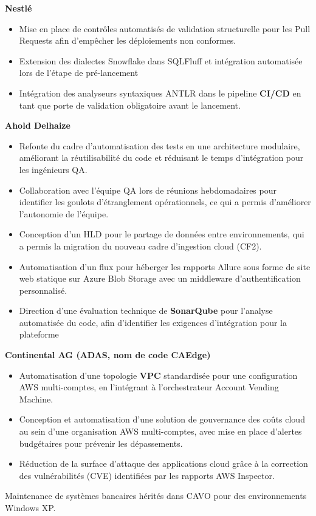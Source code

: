 \vspace{1em}
\noindent \textbf{Nestlé}
\begin{itemize}[label=\tiny$\bullet$, leftmargin=1em, nosep]
	\item Mise en place de contrôles automatisés de validation structurelle pour les Pull Requests afin d'empêcher les déploiements non conformes.
	\item Extension des dialectes Snowflake dans SQLFluff et intégration automatisée lors de l'étape de pré-lancement
	\item Intégration des analyseurs syntaxiques ANTLR dans le pipeline \textbf{CI/CD} en tant que porte de validation obligatoire avant le lancement.
\end{itemize}

\vspace{1em}
\noindent \textbf{Ahold Delhaize}
\begin{itemize}[label=\tiny$\bullet$, leftmargin=1em]
	\item Refonte du cadre d'automatisation des tests en une architecture modulaire, améliorant la réutilisabilité du code et réduisant le temps d'intégration pour les ingénieurs QA.
	\item Collaboration avec l'équipe QA lors de réunions hebdomadaires pour identifier les goulots d'étranglement opérationnels, ce qui a permis d'améliorer l'autonomie de l'équipe.
	\item Conception d'un HLD pour le partage de données entre environnements, qui a permis la migration du nouveau cadre d'ingestion cloud (CF2).
	\item Automatisation d'un flux pour héberger les rapports Allure sous forme de site web statique sur Azure Blob Storage avec un middleware d'authentification personnalisé.
	\item Direction d'une évaluation technique de \textbf{SonarQube} pour l'analyse automatisée du code, afin d'identifier les exigences d'intégration pour la plateforme
\end{itemize}

\vspace{1em}
\noindent \textbf{Continental AG (ADAS, nom de code CAEdge)}
\begin{itemize}[label=\tiny$\bullet$, leftmargin=1em]
	\item Automatisation d'une topologie \textbf{VPC} standardisée pour une configuration AWS multi-comptes, en l'intégrant à l'orchestrateur Account Vending Machine.
	\item Conception et automatisation d'une solution de gouvernance des coûts cloud au sein d'une organisation AWS multi-comptes, avec mise en place d'alertes budgétaires pour prévenir les dépassements.
	\item Réduction de la surface d'attaque des applications cloud grâce à la correction des vulnérabilités (CVE) identifiées par les rapports AWS Inspector.
\end{itemize}

\vspace{5.0ex}
\small
Maintenance de systèmes bancaires hérités dans CAVO pour des environnements Windows XP.
